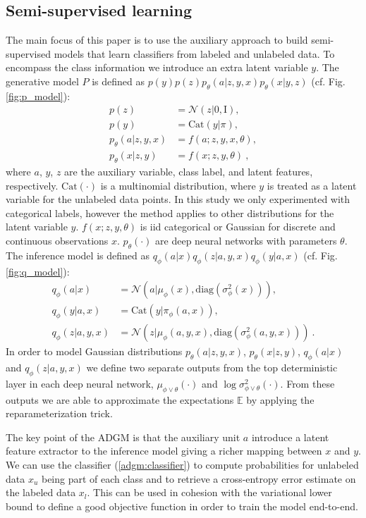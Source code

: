 \documentclass{article}
\begin{document}
\subsection{Semi-supervised learning}
The main focus of this paper is to use the auxiliary approach to build semi-supervised models that learn classifiers from labeled and unlabeled data. To encompass the class information we introduce an extra latent variable $y$. The generative model $P$ is defined as $p(y)p(z)p_\theta(a|z,y,x)p_\theta(x|y,z)$ (cf. Fig. \ref{fig:p_model}):
\begin{align}
p(z) &= \mathcal{N}(z|0,\mathrm{I}),\\ 
p(y) &= \text{Cat}(y|\pi),\\
p_\theta(a|z,y,x) &= f(a;z, y, x,\theta),\\
p_\theta(x|z,y) &= f(x;z, y, \theta)\ ,
\end{align}
where $a$, $y$, $z$ are the auxiliary variable, class label, and latent features, respectively. $\text{Cat}(\cdot)$ is a multinomial distribution, where $y$ is treated as a latent variable for the unlabeled data points. In this study we only experimented with categorical labels, however the method applies to other distributions for the latent variable $y$. $f(x;z, y, \theta)$ is iid categorical or Gaussian for discrete and continuous observations $x$. $p_\theta(\cdot)$ are deep neural networks with parameters $\theta$. The inference model is defined as $q_\phi(a|x)q_\phi(z|a,y,x)q_\phi(y|a,x)$ (cf. Fig. \ref{fig:q_model}): 
\begin{align}
q_\phi(a|x) &= \mathcal{N}(a|\mu_\phi (x), \text{diag}(\sigma_\phi^2(x))),\\
q_\phi(y|a,x) &= \text{Cat}(y|\pi_\phi(a,x)), \\ \label{adgm:classifier}
q_\phi(z|a, y, x) &= \mathcal{N}(z|\mu_\phi (a,y,x), \text{diag}(\sigma_\phi^2(a,y,x)))\ .
\end{align}
In order to model Gaussian distributions $p_\theta(a|z,y,x)$, $p_\theta(x|z,y)$, $q_\phi(a|x)$ and $q_\phi(z|a, y, x)$ we define two separate outputs from the top deterministic layer in each deep neural network, $\mu_{\phi \vee \theta}(\cdot)$ and $\log\sigma^2_{\phi \vee \theta}(\cdot)$. From these outputs we are able to approximate the expectations $\mathbb{E}$ by applying the reparameterization trick.

The key point of the ADGM is that the auxiliary unit $a$ introduce a latent feature extractor to the inference model giving a richer mapping between $x$ and $y$. We can use the classifier (\ref{adgm:classifier}) to compute probabilities for unlabeled data $x_u$ being part of each class and to retrieve a cross-entropy error estimate on the labeled data $x_l$. This can be used in cohesion with the variational lower bound to define a good objective function in order to train the model end-to-end.
\end{document}
